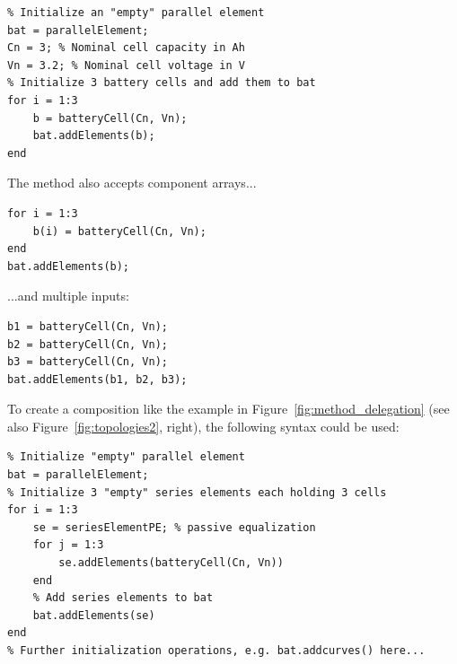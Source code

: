 \begin{lstlisting}
% Initialize an "empty" parallel element
bat = parallelElement;
Cn = 3; % Nominal cell capacity in Ah
Vn = 3.2; % Nominal cell voltage in V
% Initialize 3 battery cells and add them to bat
for i = 1:3
	b = batteryCell(Cn, Vn);
	bat.addElements(b);
end
\end{lstlisting}
The  method also accepts component arrays...
\begin{lstlisting}
for i = 1:3
	b(i) = batteryCell(Cn, Vn);
end
bat.addElements(b);
\end{lstlisting}
...and multiple inputs:
\begin{lstlisting}
b1 = batteryCell(Cn, Vn);
b2 = batteryCell(Cn, Vn);
b3 = batteryCell(Cn, Vn);
bat.addElements(b1, b2, b3);
\end{lstlisting}
To create a composition like the example in Figure~\ref{fig:method_delegation} (see also Figure~\ref{fig:topologies2}, right), the following syntax could be used:
\begin{lstlisting}
% Initialize "empty" parallel element
bat = parallelElement;
% Initialize 3 "empty" series elements each holding 3 cells
for i = 1:3
	se = seriesElementPE; % passive equalization
	for j = 1:3
		se.addElements(batteryCell(Cn, Vn))
	end
	% Add series elements to bat
	bat.addElements(se)
end
% Further initialization operations, e.g. bat.addcurves() here...
\end{lstlisting}


